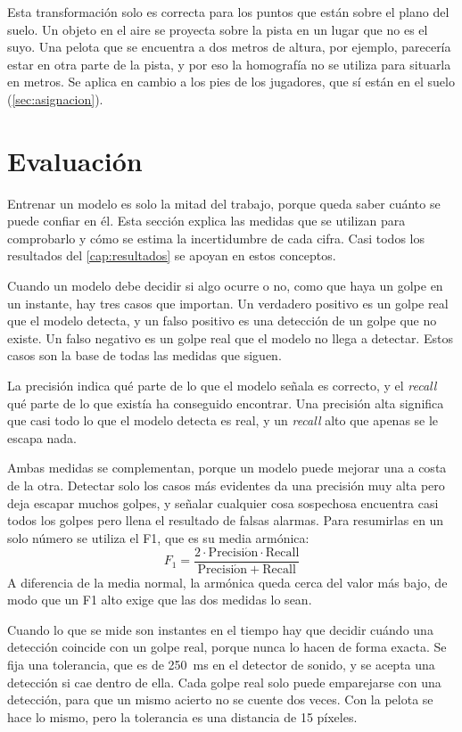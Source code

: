 Esta transformación solo es correcta para los puntos que están sobre el plano del suelo.
Un objeto en el aire se proyecta sobre la pista en un lugar que no es el suyo.
Una pelota que se encuentra a dos metros de altura, por ejemplo, parecería estar en otra parte de la pista, y por eso la homografía no se utiliza para situarla en metros.
Se aplica en cambio a los pies de los jugadores, que sí están en el suelo (\cref{sec:asignacion}).

\section{Evaluación}
\label{sec:fund-evaluacion}

Entrenar un modelo es solo la mitad del trabajo, porque queda saber cuánto se puede confiar en él.
Esta sección explica las medidas que se utilizan para comprobarlo y cómo se estima la incertidumbre de cada cifra.
Casi todos los resultados del \cref{cap:resultados} se apoyan en estos conceptos.

Cuando un modelo debe decidir si algo ocurre o no, como que haya un golpe en un instante, hay tres casos que importan.
Un verdadero positivo es un golpe real que el modelo detecta, y un falso positivo es una detección de un golpe que no existe.
Un falso negativo es un golpe real que el modelo no llega a detectar.
Estos casos son la base de todas las medidas que siguen.

La precisión indica qué parte de lo que el modelo señala es correcto, y el \textit{recall} qué parte de lo que existía ha conseguido encontrar.
Una precisión alta significa que casi todo lo que el modelo detecta es real, y un \textit{recall} alto que apenas se le escapa nada.

Ambas medidas se complementan, porque un modelo puede mejorar una a costa de la otra.
Detectar solo los casos más evidentes da una precisión muy alta pero deja escapar muchos golpes, y señalar cualquier cosa sospechosa encuentra casi todos los golpes pero llena el resultado de falsas alarmas.
Para resumirlas en un solo número se utiliza el F1, que es su media armónica:
\begin{equation}
  F_1 = \frac{2 \cdot \mathrm{Precisi\acute{o}n} \cdot \mathrm{Recall}}{\mathrm{Precisi\acute{o}n} + \mathrm{Recall}}
  \label{eq:f1}
\end{equation}
A diferencia de la media normal, la armónica queda cerca del valor más bajo, de modo que un F1 alto exige que las dos medidas lo sean.

Cuando lo que se mide son instantes en el tiempo hay que decidir cuándo una detección coincide con un golpe real, porque nunca lo hacen de forma exacta.
Se fija una tolerancia, que es de 250~ms en el detector de sonido, y se acepta una detección si cae dentro de ella.
Cada golpe real solo puede emparejarse con una detección, para que un mismo acierto no se cuente dos veces.
Con la pelota se hace lo mismo, pero la tolerancia es una distancia de 15 píxeles.


